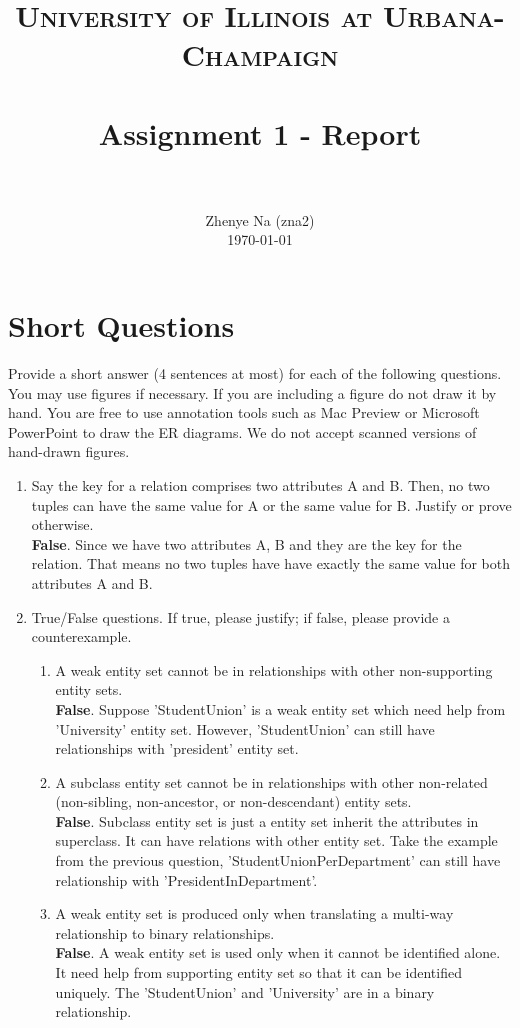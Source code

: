 \documentclass[paper=a4, fontsize=11pt]{scrartcl}
\title{
		\usefont{OT1}{bch}{b}{n}
		\normalfont \normalsize \textsc{University of Illinois at Urbana-Champaign} \\ [25pt]
		\horrule{0.5pt} \\[0.4cm]
		\huge Assignment 1 - Report \\
		\horrule{2pt} \\[0.5cm]
}
\author{
		\normalfont 								\normalsize
        Zhenye Na (zna2)\\[-3pt]		\normalsize
        \today
}
\date{}
\numberwithin{equation}{section}		%
\numberwithin{figure}{section}			%
\numberwithin{table}{section}				%
\begin{document}
\maketitle

\section{Short Questions}
Provide a short answer (4 sentences at most) for each of the following questions. You may use figures if necessary. If you are including a figure do not draw it by hand. You are free to use annotation tools such as Mac Preview or Microsoft PowerPoint to draw the ER diagrams. We do not accept scanned versions of hand-drawn figures.

\begin{enumerate}
	\item Say the key for a relation comprises two attributes A and B. Then, no two tuples can have the same value for A or the same value for B. Justify or prove otherwise.\\
	\textbf{False}. Since we have two attributes A, B and they are the key for the relation. That means no two tuples have have exactly the same value for both attributes A and B.
	\item True/False questions. If true, please justify; if false, please provide a counterexample.
	\begin{enumerate}
		\item A weak entity set cannot be in relationships with other non-supporting entity sets.\\
		\textbf{False}. Suppose 'StudentUnion' is a weak entity set which need help from 'University' entity set. However, 'StudentUnion' can still have relationships with 'president' entity set.
		\item A subclass entity set cannot be in relationships with other non-related (non-sibling, non-ancestor, or non-descendant) entity sets.\\
		\textbf{False}. Subclass entity set is just a entity set inherit the attributes in superclass. It can have relations with other entity set. Take the example from the previous question, 'StudentUnionPerDepartment' can still have relationship with 'PresidentInDepartment'.
		\item A weak entity set is produced only when translating a multi-way relationship to binary relationships.\\
		\textbf{False}. A weak entity set is used only when it cannot be identified alone. It need help from supporting entity set so that it can be identified uniquely. The 'StudentUnion' and 'University' are in a binary relationship.

\end{enumerate}
\end{enumerate}
\end{document}
